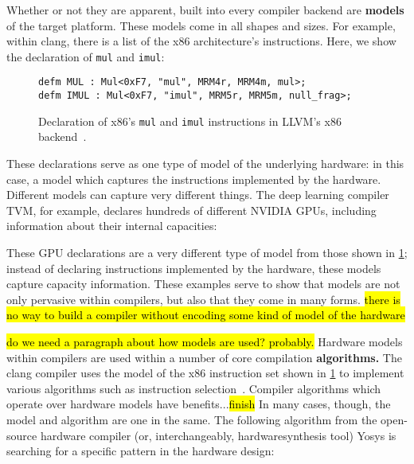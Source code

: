 Whether or not they are apparent,
  built into every compiler backend
  are \textbf{models}
  of the target platform.
These models come in all shapes
  and sizes.
For example,
  within clang, there is a list
  of the x86 architecture's
  instructions.
Here,
  we show the declaration of
  \texttt{mul} and \texttt{imul}:
  
\begin{figure}[H]
    \centering
\begin{verbatim}
defm MUL : Mul<0xF7, "mul", MRM4r, MRM4m, mul>;
defm IMUL : Mul<0xF7, "imul", MRM5r, MRM5m, null_frag>;
\end{verbatim}
\caption{
Declaration of x86's
  \texttt{mul} and \texttt{imul}
  instructions in LLVM's x86 
  backend~\cite{llvmx86tablegen}.
}
    \label{fig:intro:llvm-tablegen}
\end{figure}

\noindent
These declarations
  serve as one type of model
  of the underlying hardware:
  in this case, a model which captures
  the instructions
  implemented by the hardware.
Different models
  can capture very different things.
The deep learning compiler TVM,
  for example,
  declares 
  hundreds of different NVIDIA GPUs,
  including information
  about their internal capacities:



\noindent
These GPU declarations
  are a very different type of model
  from those shown in
  \cref{fig:intro:llvm-tablegen};
  instead of declaring instructions
  implemented by the hardware,
  these models capture
  capacity information.
These examples serve to show
  that models are not only pervasive
  within compilers,
  but also that
  they come in many forms.
\hl{there is no way to build a compiler
  without encoding some kind 
  of model of the hardware}

\hl{do we need a paragraph
  about how models are used?
probably.}
Hardware models
  within compilers
  are used within a number of core
  compilation
  \textbf{algorithms.}
The clang compiler uses 
  the model of the x86 instruction set
  shown in \cref{fig:intro:llvm-tablegen}
  to implement
  various algorithms
  such as instruction 
  selection~\cite{llvminstructionselection}.
Compiler algorithms
  which operate over hardware models
  have benefits...\hl{finish}
In many cases, though,
  the model and algorithm are 
  one in the same.
The following algorithm
  from the open-source hardware compiler
  (or, interchangeably,
    \gls{hardwaresynthesis} tool)
  Yosys
  is searching for a specific pattern 
  in the hardware design:

